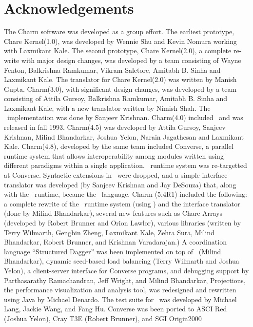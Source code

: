 \section {Acknowledgements}

The Charm software was developed as a
group effort.  The earliest prototype, Chare Kernel(1.0), was
developed by Wennie Shu and Kevin Nomura working with Laxmikant
Kale.  The second prototype, Chare Kernel(2.0), a complete
re-write with major design changes, was developed by a team
consisting of Wayne Fenton, Balkrishna Ramkumar, Vikram Saletore,
Amitabh B. Sinha and Laxmikant Kale. The translator for Chare
Kernel(2.0) was written by Manish Gupta.  Charm(3.0), with
significant design changes, was developed by a team consisting of
Attila Gursoy, Balkrishna Ramkumar, Amitabh B.  Sinha and
Laxmikant Kale, with a new translator written by Nimish Shah.  The
\charmpp\ implementation was done by Sanjeev Krishnan.  Charm(4.0)
included \charmpp\ and was released in fall 1993.  Charm(4.5) was
developed by Attila Gursoy, Sanjeev Krishnan, Milind Bhandarkar,
Joshua Yelon, Narain Jagathesan and Laxmikant Kale.  Charm(4.8),
developed by the same team included Converse, a parallel runtime
system that allows interoperability among modules written using
different paradigms within a single application. \charmpp\ runtime
system was re-targetted at Converse. Syntactic extensions in
\charmpp\ were dropped, and a simple interface translator was
developed (by Sanjeev Krishnan and Jay DeSouza) that, along with
the \charmpp\ runtime, became the \charmpp\ language.  Charm
(5.4R1) included the following: a complete rewrite of the
\charmpp\ runtime system (using \CC) and the interface translator
(done by Milind Bhandarkar), several new features such as Chare
Arrays (developed by Robert Brunner and Orion Lawlor), various
libraries (written by Terry Wilmarth, Gengbin Zheng, Laxmikant
Kale, Zehra Sura, Milind Bhandarkar, Robert Brunner, and Krishnan
Varadarajan.) A coordination language ``Structured Dagger'' was
been implemented on top of \charmpp\ (Milind Bhandarkar), dynamic
seed-based load balancing (Terry Wilmarth and Joshua Yelon), a
client-server interface for Converse programs, and debugging
support by Parthasarathy Ramachandran, Jeff Wright, and Milind
Bhandarkar, Projections, the performance visualization and
analysis tool, was redesigned and rewritten using Java by Michael
Denardo. The test suite for \charmpp\ was developed by Michael
Lang, Jackie Wang, and Fang Hu. Converse was been ported to ASCI
Red (Joshua Yelon), Cray T3E (Robert Brunner), and SGI Origin2000
